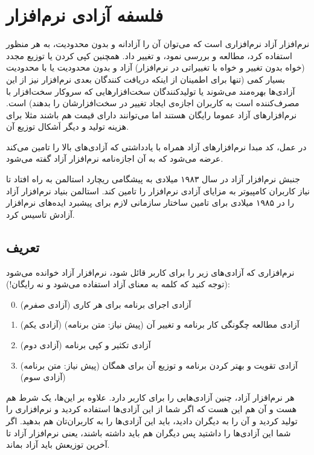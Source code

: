 \section{فلسفه آزادی نرم‌افزار}

نرم‌افزار آزاد نرم‌افزاری است که می‌توان آن را آزادانه و بدون محدودیت، به هر منظور استفاده کرد، مطالعه و بررسی نمود، و تغییر داد. همچنین کپی کردن یا توزیع مجدد (خواه بدون تغییر و خواه با تغییراتی در نرم‌افزار) آزاد و بدون محدودیت یا با محدودیت بسیار کمی (تنها برای اطمینان از اینکه دریافت کنندگان بعدی نرم‌افزار نیز از این آزادی‌ها بهره‌مند می‌شوند یا تولیدکنندگان سخت‌افزارهایی که سروکار سخت‌افزار با مصرف‌کننده‌ است به کاربران اجازه‌ی ایجاد تغییر در سخت‌افزارشان را بدهند) است. نرم‌افزارهای آزاد عموما رایگان هستند اما می‌توانند دارای قیمت هم باشند مثلا برای هزینه تولید  و دیگر اَشکال توزیع آن.

در عمل، کد مبدا نرم‌افزارهای آزاد همراه با یادداشتی که آزادی‌های بالا را تامین می‌کند عرضه می‌شود که به آن اجازه‌نامه نرم‌افزار آزاد گفته می‌شود.

جنبش نرم‌افزار آزاد در سال ۱۹۸۳ میلادی به پیشگامی ریچارد استالمن به راه افتاد تا نیاز کاربران کامپیوتر به مزایای آزادی نرم‌افزار را تامین کند. استالمن بنیاد نرم‌افزار آزاد را در ۱۹۸۵ میلادی برای تامین ساختار سازمانی لازم برای پیشبرد ایده‌های نرم‌افزار آزادش تاسیس کرد.
\subsection*{تعریف}
\begin{mdframed}
نرم‌افزاری که آزادی‌های زیر را برای کاربر قائل شود، نرم‌افزار آزاد خوانده می‌شود (توجه کنید که کلمه  به معنای آزاد استفاده می‌شود و نه رایگان!):
\begin{enumerate}
	\setcounter{enumi}{-1}
	\item آزادی اجرای برنامه برای هر کاری (آزادی صفرم)
	\item آزادی مطالعه چگونگی کار برنامه و تغییر آن (پیش نیاز: متن برنامه) (آزادی یکم)
	\item آزادی تکثیر و کپی برنامه (آزادی دوم)
	\item آزادی تقویت و بهتر کردن برنامه و توزیع آن برای همگان (پیش نیاز: متن برنامه) (آزادی سوم)
\end{enumerate}
\end{mdframed}
هر نرم‌افزار آزاد، چنین آزادی‌هایی را برای کاربر دارد. علاوه بر این‌ها، یک شرط هم هست و آن هم این هست که اگر شما از این آزادی‌ها استفاده کردید و نرم‌افزاری را تولید کردید و آن را به دیگران دادید، باید این آزادی‌ها را به کاربران‌تان هم بدهید. اگر شما این آزادی‌ها را داشتید پس دیگران هم باید داشته باشند، یعنی نرم‌افزار آزاد تا آخرین توزیعش باید آزاد بماند.

